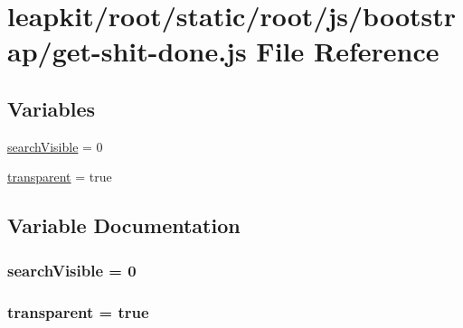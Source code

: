 \hypertarget{root_2static_2root_2js_2bootstrap_2get-shit-done_8js}{\section{leapkit/root/static/root/js/bootstrap/get-\/shit-\/done.js File Reference}
\label{root_2static_2root_2js_2bootstrap_2get-shit-done_8js}
}
\subsection*{Variables}
\begin{DoxyCompactItemize}
\item 
\hyperlink{root_2static_2root_2js_2bootstrap_2get-shit-done_8js_a169a672a87ad7c44e789ba999e951746}{search\-Visible} = 0
\item 
\hyperlink{root_2static_2root_2js_2bootstrap_2get-shit-done_8js_afcf048cb5f3a491171d07131ff77f83c}{transparent} = true
\end{DoxyCompactItemize}


\subsection{Variable Documentation}
\hypertarget{root_2static_2root_2js_2bootstrap_2get-shit-done_8js_a169a672a87ad7c44e789ba999e951746}{
\subsubsection[{search\-Visible}]{\setlength{\rightskip}{0pt plus 5cm}search\-Visible = 0}}\label{root_2static_2root_2js_2bootstrap_2get-shit-done_8js_a169a672a87ad7c44e789ba999e951746}
\hypertarget{root_2static_2root_2js_2bootstrap_2get-shit-done_8js_afcf048cb5f3a491171d07131ff77f83c}{
\subsubsection[{transparent}]{\setlength{\rightskip}{0pt plus 5cm}transparent = true}}\label{root_2static_2root_2js_2bootstrap_2get-shit-done_8js_afcf048cb5f3a491171d07131ff77f83c}
